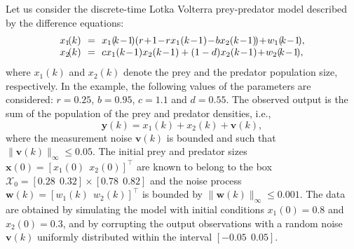 \documentclass[twocolumn]{autart}
\begin{document}
%


Let us consider the discrete-time Lotka Volterra prey-predator model \cite{2013Raj} described by the difference equations:
{  \begin{equation}
\label{eq:Volterra}
\begin{array}[pos]{rcl}
 x_1\!(k)&\!\!=\!\!& x_1(\!k\!-\!1\!)\!\left(r\!+\!1\!-\!rx_1(k\!-\!1)\!-\!bx_2(k\!-\!1)\!\right)\!+\!w_1(\!k\!-\!1\!),\\
   x_2\!(k)&\!\!=\!\!& cx_1(k\!-\!1)x_2(k\!-\!1)+(1-d)x_2(k\!-\!1)\!+\!w_2(\!k\!-\!1\!),
\end{array}
\end{equation}}
where $x_1(k)$ and $x_2(k)$ denote the prey and the predator population size, respectively. In the example, the following values of the parameters are considered: $r=0.25$, $b=0.95$, $c=1.1$ and  $d=0.55$. The observed output is the sum of the population of the prey and predator densities, i.e.,
\begin{equation}
\mathbf{y}(k)=x_1(k)+x_2(k)+\mathbf{v}(k),
\end{equation}
where the measurement noise $\mathbf{v}(k)$ is bounded and such that $\|\mathbf{v}(k)\|_{\infty} \leq 0.05$. The initial prey and predator sizes $\mathbf{x}(0)=\left[ x_1(0) \ \ x_2(0)\right]^{\top}$ are known to belong to the box $\displaystyle \mathcal{X}_0=\left[ 0.28 \ \ 0.32\right]\times\left[ 0.78 \ \ 0.82\right]$ and the noise process $\mathbf{w}(k)=[w_1(k) \ \ w_2(k)]^\top$ is bounded by $\|\mathbf{w}(k)\|_{\infty} \leq 0.001$. The data are obtained by simulating the model with initial conditions $x_1(0)=0.8$ and $x_2(0)=0.3$, and by corrupting the output observations with a random noise $\mathbf{v}(k)$ uniformly distributed within the interval $[-0.05 \ \ 0.05]$.
\end{document}
